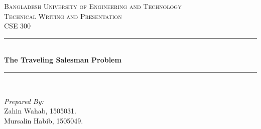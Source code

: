 \documentclass[12pt]{article}
\begin{document}
\begin{titlepage}

\newcommand{\HRule}{\rule{\linewidth}{0.5mm}} %

\center %
 

\textsc{\LARGE Bangladesh University of Engineering and Technology}\\[1.5cm] %
\textsc{\Large Technical Writing and Presentation}\\[0.5cm] %
\textsc{\large CSE 300}\\[0.5cm] %


\HRule \\[0.4cm]
{ \huge \bfseries The Traveling Salesman Problem}\\[0.4cm] %
\HRule \\[1.5cm]
 

\vspace{15mm}

\begin{flushright}
    \emph{Prepared By:} \\
    \vspace{2mm}
    \small Zahin Wahab, 1505031.\\
    \small Mursalin Habib, 1505049.\\
\end{flushright}

\vspace*{\fill}


\end{titlepage}
\end{document}
